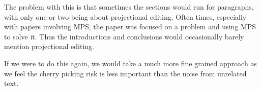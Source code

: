 The problem with this is that sometimes the sections would run for paragraphs, with only one or two being about projectional editing.
Often times, especially with papers involving MPS, the paper was focused on a problem and using MPS to solve it.
Thus the introductions and conclusions would occasionally barely mention projectional editing.

If we were to do this again, we would take a much more fine grained approach as we feel the cherry picking risk is less important than the noise from unrelated text.
